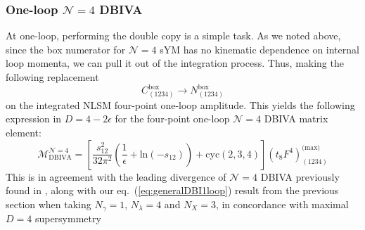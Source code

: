 \documentclass[12pt,letter]{article}
\def\eqn#1{eq.~(\ref{#1})}
\begin{document}
\subsubsection{One-loop $\mathcal{N}=4$ DBIVA} \label{sec:DBIvDC1loop}
At one-loop, performing the double copy is a simple task. As we noted above, since the box numerator for $\mathcal{N}=4$ sYM has no kinematic dependence on internal loop momenta, we can pull it out of the integration process. Thus, making the following replacement 
\begin{equation}
C^{\text{box}}_{(1234)} \rightarrow N^{\text{box}}_{(1234)}
\end{equation}
on the integrated NLSM four-point one-loop amplitude. This yields the following expression in $D=4-2\epsilon$ for the four-point one-loop $\mathcal{N}=4$ DBIVA matrix element:
\begin{equation}
\mathcal{M}^{\mathcal{N}=4}_{\text{DBIVA}} = \left[\frac{s_{12}^2}{32\pi^2}\left(\frac{1}{\epsilon} +\text{ln}(-s_{12})\right)+\text{cyc}(2,3,4)\right](t_8F^4)^{\text{(max)}}_{(1234)} 
\end{equation}
This is in agreement with the leading divergence of $\mathcal{N}=4$ DBIVA previously found in \cite{Elvang:2020kuj}, along with our \eqn{eq:generalDBI1loop} result from the previous section when taking $N_\gamma =1$, $N_\lambda=4$ and $N_X=3$, in concordance with maximal $D=4$ supersymmetry 
\end{document}
